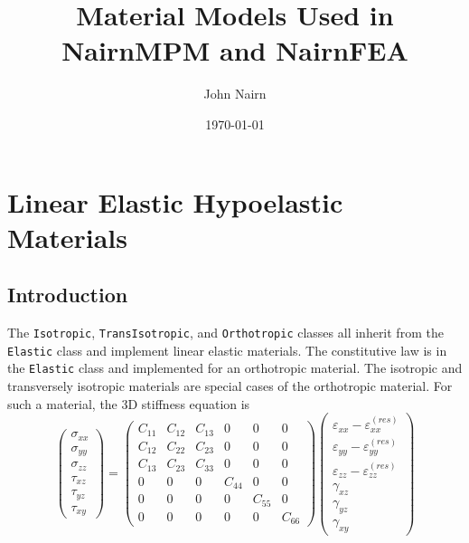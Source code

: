 \documentclass[11pt]{book}
\title{Material Models Used in NairnMPM and NairnFEA}
\author{John Nairn}
\date{\today}
\def\code#1{{\small\tt #1}}
\def\e#1{\varepsilon_{#1}}
\def\er#1{\varepsilon_{#1}^{(res)}}
\def\g#1{\gamma_{#1}}
\def\s#1{\sigma_{#1}}
\def\t#1{\tau_{#1}}
\begin{document}
\maketitle

\tableofcontents

\chapter{Linear Elastic Hypoelastic Materials}

\section{Introduction}

The \code{Isotropic}, \code{TransIsotropic}, and \code{Orthotropic} classes all inherit from the \code{Elastic} class and implement linear elastic materials. The constitutive law is in the \code{Elastic} class and implemented for an orthotropic material. The isotropic and transversely isotropic materials are special cases of the orthotropic material. For such a material, the 3D stiffness equation is
\begin{equation}
     \left(\begin{array}{c} \s{xx} \\ \s{yy} \\ \s{zz} \\ \t{xz} \\ \t{yz} \\ \t{xy} \end{array}\right)
       =  \left(\begin{array}{cccccc}
      C_{11} & C_{12} & C_{13} & 0 & 0 & 0 \\
      C_{12} & C_{22} & C_{23} & 0 & 0 & 0 \\
      C_{13} & C_{23} & C_{33} & 0 & 0 & 0 \\
      0 & 0 & 0 & C_{44} & 0 & 0 \\
      0 & 0 & 0 & 0 & C_{55} & 0  \\
      0 & 0 & 0 & 0 & 0 &  C_{66}  \end{array}\right)
     \left(\begin{array}{c} \e{xx} -\er{xx} \\ \e{yy} -\er{yy} \\ \e{zz} -\er{zz}\\ 
                   \g{xz} \\ \g{yz} \\ \g{xy} \end{array}\right)
\end{equation}
\end{document}
